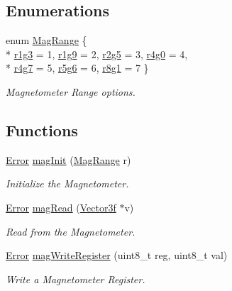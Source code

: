 \subsection*{Enumerations}
\begin{DoxyCompactItemize}
\item 
enum \hyperlink{group__mag_ga3af649d913d146d6654db2354d88c18a}{Mag\-Range} \{ \\*
\hyperlink{group__mag_gga3af649d913d146d6654db2354d88c18aa18e06791b32b1772765ff7e54d3e24fd}{r1g3} = 1, 
\hyperlink{group__mag_gga3af649d913d146d6654db2354d88c18aa8cab223a26c8b984d14dd7214ec4f5f6}{r1g9} = 2, 
\hyperlink{group__mag_gga3af649d913d146d6654db2354d88c18aa19f90e5cf717669e72908f8d8a1c9f89}{r2g5} = 3, 
\hyperlink{group__mag_gga3af649d913d146d6654db2354d88c18aa402a6d56b75bc48c8521500dd8b38bd8}{r4g0} = 4, 
\\*
\hyperlink{group__mag_gga3af649d913d146d6654db2354d88c18aaa7401534bd82cade38cbb47c0ff4223e}{r4g7} = 5, 
\hyperlink{group__mag_gga3af649d913d146d6654db2354d88c18aa815faf18742b2b13ba477eed930851f4}{r5g6} = 6, 
\hyperlink{group__mag_gga3af649d913d146d6654db2354d88c18aa1cb5526ddb90c9b33beb87c0d5ad97ee}{r8g1} = 7
 \}
\begin{DoxyCompactList}\small\item\em Magnetometer Range options. \end{DoxyCompactList}\end{DoxyCompactItemize}
\subsection*{Functions}
\begin{DoxyCompactItemize}
\item 
\hyperlink{group__error_ga2c3e4bb40f36b262a5214e2da2bca9c5}{Error} \hyperlink{group__mag_ga7e5d5e6448efb84e8805e2fbea9cb374}{mag\-Init} (\hyperlink{group__mag_ga3af649d913d146d6654db2354d88c18a}{Mag\-Range} r)
\begin{DoxyCompactList}\small\item\em Initialize the Magnetometer. \end{DoxyCompactList}\item 
\hyperlink{group__error_ga2c3e4bb40f36b262a5214e2da2bca9c5}{Error} \hyperlink{group__mag_gacc0c83a48498170ef36451db2c684abb}{mag\-Read} (\hyperlink{struct_vector3f}{Vector3f} $\ast$v)
\begin{DoxyCompactList}\small\item\em Read from the Magnetometer. \end{DoxyCompactList}\item 
\hyperlink{group__error_ga2c3e4bb40f36b262a5214e2da2bca9c5}{Error} \hyperlink{group__mag_gafaf03e3013fe2046847afc2518f23eed}{mag\-Write\-Register} (uint8\-\_\-t reg, uint8\-\_\-t val)
\begin{DoxyCompactList}\small\item\em Write a Magnetometer Register. \end{DoxyCompactList}\end{DoxyCompactItemize}


